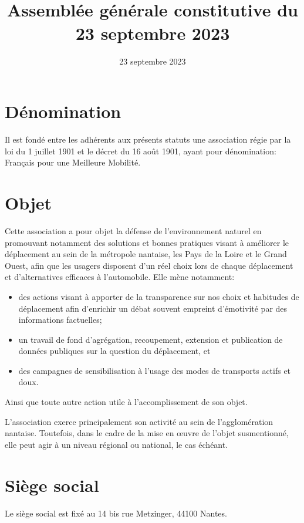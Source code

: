 \documentclass[11 pt]{article}
\title{\fmm \\[4mm]
\large Assemblée générale constitutive du 23 septembre 2023}
\date{23 septembre 2023}
\newcommand\fmm[0]{Français pour une Meilleure Mobilité}
\begin{document}
\maketitle

\section{Dénomination}

Il est fondé entre les adhérents aux présents statuts une association
régie par la loi du 1\ier{} juillet 1901 et le décret du 16 août 1901,
ayant pour dénomination: \og\fmm\fg.


\section{Objet}

Cette association a pour objet la défense de l’environnement naturel
en promouvant notamment des solutions et bonnes pratiques visant à
améliorer le déplacement au sein de la métropole nantaise, les Pays de
la Loire et le Grand Ouest, afin que les usagers disposent d’un réel
choix lors de chaque déplacement et d’alternatives efficaces à
l’automobile. Elle mène notamment:

\begin{itemize}
\item des actions visant à apporter de la transparence sur nos choix
  et habitudes de déplacement afin d’enrichir un débat souvent
  empreint d’émotivité par des informations factuelles;
\item un travail de fond d’agrégation, recoupement, extension et
  publication de données publiques sur la question du déplacement, et
\item des campagnes de sensibilisation à l’usage des modes de
  transports actifs et doux.
\end{itemize}

Ainsi que toute autre action utile à l’accomplissement de son objet.

L’association exerce principalement son activité au sein de
l’agglomération nantaise. Toutefois, dans le cadre de la mise en
œuvre de l’objet susmentionné, elle peut agir à un niveau régional ou
national, le cas échéant.

\section{Siège social}

Le siège social est fixé au 14 bis rue Metzinger, 44100 Nantes.
\end{document}
